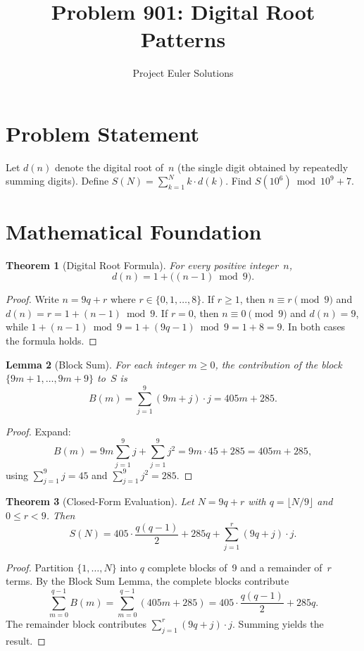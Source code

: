 \documentclass[11pt]{article}
\title{Problem 901: Digital Root Patterns}
\author{Project Euler Solutions}
\date{}
\newtheorem{theorem}{Theorem}
\newtheorem{lemma}[theorem]{Lemma}
\begin{document}
\maketitle

\section{Problem Statement}

Let $d(n)$ denote the digital root of~$n$ (the single digit obtained by repeatedly summing digits). Define $S(N) = \sum_{k=1}^{N} k \cdot d(k)$. Find $S(10^6) \bmod 10^9+7$.

\section{Mathematical Foundation}

\begin{theorem}[Digital Root Formula]
For every positive integer~$n$,
\[
d(n) = 1 + \bigl((n-1) \bmod 9\bigr).
\]
\end{theorem}

\begin{proof}
Write $n = 9q + r$ where $r \in \{0, 1, \ldots, 8\}$. If $r \ge 1$, then $n \equiv r \pmod{9}$ and $d(n) = r = 1 + (n-1) \bmod 9$. If $r = 0$, then $n \equiv 0 \pmod{9}$ and $d(n) = 9$, while $1 + (n-1) \bmod 9 = 1 + (9q - 1) \bmod 9 = 1 + 8 = 9$. In both cases the formula holds.
\end{proof}

\begin{lemma}[Block Sum]
For each integer $m \ge 0$, the contribution of the block $\{9m+1, \ldots, 9m+9\}$ to~$S$ is
\[
B(m) = \sum_{j=1}^{9}(9m+j)\cdot j = 405m + 285.
\]
\end{lemma}

\begin{proof}
Expand:
\[
B(m) = 9m\sum_{j=1}^{9} j + \sum_{j=1}^{9} j^2 = 9m \cdot 45 + 285 = 405m + 285,
\]
using $\sum_{j=1}^{9} j = 45$ and $\sum_{j=1}^{9} j^2 = 285$.
\end{proof}

\begin{theorem}[Closed-Form Evaluation]
Let $N = 9q + r$ with $q = \lfloor N/9 \rfloor$ and $0 \le r < 9$. Then
\[
S(N) = 405 \cdot \frac{q(q-1)}{2} + 285q + \sum_{j=1}^{r}(9q+j)\cdot j.
\]
\end{theorem}

\begin{proof}
Partition $\{1, \ldots, N\}$ into $q$ complete blocks of~9 and a remainder of~$r$ terms. By the Block Sum Lemma, the complete blocks contribute
\[
\sum_{m=0}^{q-1} B(m) = \sum_{m=0}^{q-1}(405m + 285) = 405 \cdot \frac{q(q-1)}{2} + 285q.
\]
The remainder block contributes $\sum_{j=1}^{r}(9q+j) \cdot j$. Summing yields the result.
\end{proof}
\end{document}
